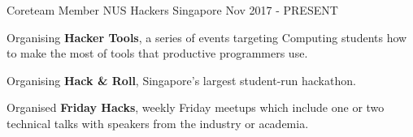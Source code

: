 

\begin{cventries}

  \cventry
  {Coreteam Member} %
  {NUS Hackers} %
  {Singapore} %
  {Nov 2017 - PRESENT} %
  {
    \begin{cvitems} %
      \item {Organising \textbf{Hacker Tools}, a series of events targeting Computing students how to make the most of tools that productive programmers use.}
      \item {Organising \textbf{Hack \& Roll}, Singapore's largest student-run hackathon.}
      \item {Organised \textbf{Friday Hacks}, weekly Friday meetups which include one or two technical talks with speakers from the industry or academia.}
    \end{cvitems}
  }


\end{cventries}
